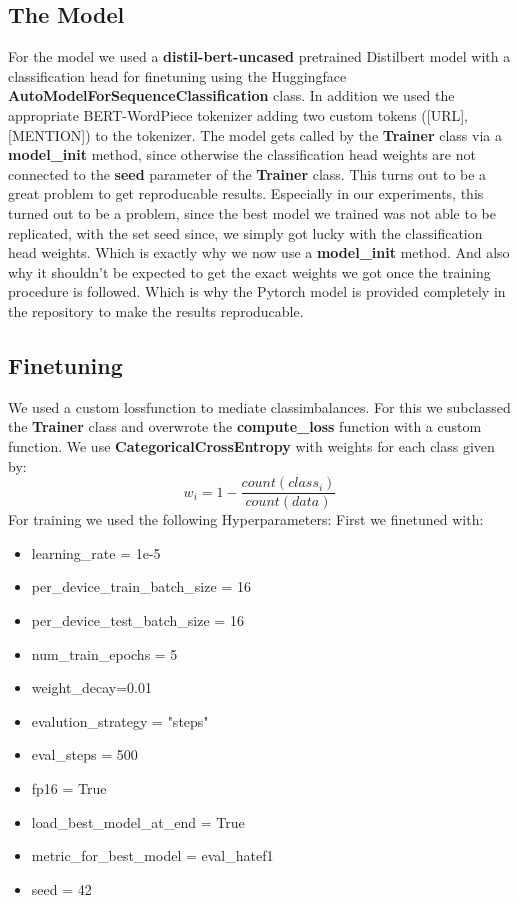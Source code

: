 \documentclass[11pt,a4paper]{article}
\begin{document}
\subsection{The Model}
For the model we used a \textbf{distil-bert-uncased} pretrained Distilbert model with a classification head for finetuning
using the Huggingface \textbf{AutoModelForSequenceClassification} class. In addition we used the appropriate BERT-WordPiece 
tokenizer adding two custom tokens ([URL],[MENTION]) to the tokenizer.
The model gets called by the \textbf{Trainer} class via a \textbf{model\_init} method, since otherwise the classification head
weights are not connected to the \textbf{seed} parameter of the \textbf{Trainer} class.
This turns out to be a great problem to get reproducable results.
Especially in our experiments, this turned out to be a problem, since the best model we trained was not able to be replicated,
with the set seed since, we simply got lucky with the classification head weights. Which is exactly why we now use a \textbf{model\_init} method.
And also why it shouldn't be expected to get the exact weights we got once the training procedure is followed.
Which is why the Pytorch model is provided completely in the repository to make the results reproducable.

\subsection{Finetuning}
We used a custom lossfunction to mediate classimbalances.
For this we subclassed the \textbf{Trainer} class and overwrote the \textbf{compute\_loss} function with a custom function.
We use \textbf{CategoricalCrossEntropy} with weights for each class given by:
$$ w_i = 1 - \frac{count(class_i)}{count(data)}$$
For training we used the following Hyperparameters:
First we finetuned with: 
\begin{itemize}
    \setlength{\itemsep}{0.5pt}
    \item learning\_rate = 1e-5
    \item per\_device\_train\_batch\_size = 16
    \item per\_device\_test\_batch\_size = 16
    \item num\_train\_epochs = 5
    \item weight\_decay=0.01
    \item evalution\_strategy = "steps"
    \item eval\_steps = 500
    \item fp16 = True
    \item load\_best\_model\_at\_end = True
    \item metric\_for\_best\_model = eval\_hatef1
    \item seed = 42
\end{itemize}
\end{document}
